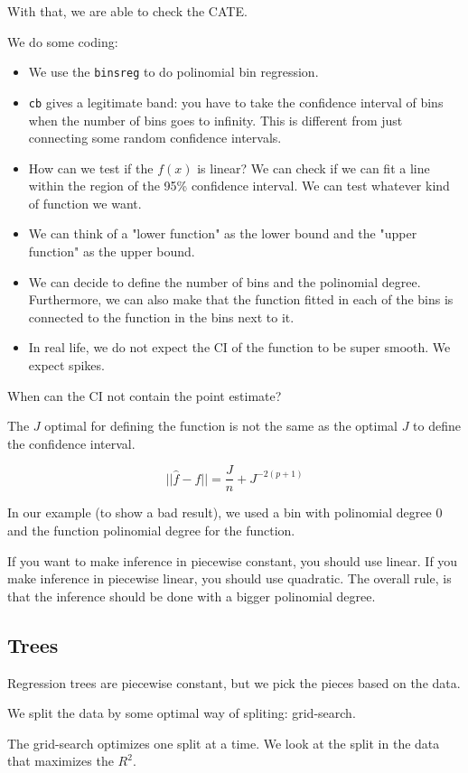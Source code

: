 \documentclass{article}
\begin{document}
With that, we are able to check the CATE.

We do some coding:
\begin{itemize}
    \item We use the \texttt{binsreg} to do polinomial bin regression.
    \item \texttt{cb} gives a legitimate band: you have to take the confidence interval of bins when the number of bins goes to infinity. This is different from just connecting some random confidence intervals.
    \item How can we test if the $f(x)$ is linear? We can check if we can fit a line within the region of the 95\% confidence interval. We can test whatever kind of function we want.
    \item We can think of a "lower function" as the lower bound and the "upper function" as the upper bound.
    \item We can decide to define the number of bins and the polinomial degree. Furthermore, we can also make that the function fitted in each of the bins is connected to the function in the bins next to it.
    \item In real life, we do not expect the CI of the function to be super smooth. We expect spikes.
\end{itemize}

When can the CI not contain the point estimate?

The $J$ optimal for defining the function is not the same as the optimal $J$ to define the confidence interval.

$$
|| \hat{f} - f || = \frac{J}{n} + J^{-2(p+1)}
$$

In our example (to show a bad result), we used a bin with polinomial degree 0 and the function polinomial degree for the function.

If you want to make inference in piecewise constant, you should use linear. If you make inference in piecewise linear, you should use quadratic. The overall rule, is that the inference should be done with a bigger polinomial degree.

\subsection{Trees}
Regression trees are piecewise constant, but we pick the pieces based on the data.

We split the data by some optimal way of spliting: grid-search.

The grid-search optimizes one split at a time. We look at the split in the data that maximizes the $R^2$.
\end{document}
